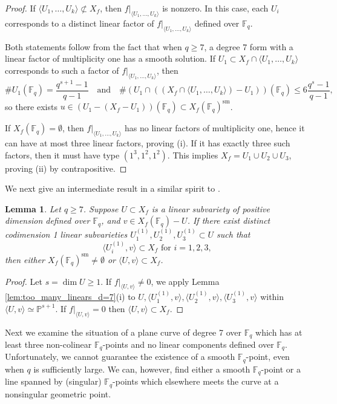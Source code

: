 \documentclass{amsart}
\newcommand{\F}{\mathbb{F}}
\renewcommand{\P}{\mathbb{P}}
\newcommand{\Span}[1]{\langle #1 \rangle}
\newcommand{\sm}{\mathrm{sm}}
\newtheorem{lemma}[theorem]{Lemma}
\theoremstyle{definition}
\numberwithin{equation}{section}
\numberwithin{table}{section}
\newcommand{\qboundgeq}[1]{{\color{cyan}$q \geq {#1}$}}
\renewcommand{\qboundgeq}[1]{{$q \geq {#1}$}}
\begin{document}
\begin{proof}
    If $\Span{U_1,\ldots,U_k} \not\subset X_f$, then $f|_{\Span{U_1,\ldots,U_k}}$ is nonzero. In this case, each $U_i$ corresponds to a distinct linear factor of $f|_{\Span{U_1,\ldots,U_k}}$ defined over $\F_q$. 
    
    Both statements follow from the fact that when \qboundgeq{7}, a degree 7 form with a linear factor of multiplicity one has a smooth solution. If $U_1 \subset X_f \cap \Span{U_1,\ldots,U_k}$ corresponds to such a factor of $f|_{\Span{U_1,\ldots,U_k}}$, then 
    \[\#U_1(\F_q) = \frac{q^{s+1} - 1}{q-1} \quad\text{and}\quad \#(U_1 \cap ((X_f \cap \Span{U_1,\ldots,U_k}) - U_1))(\F_q) \leq 6\frac{q^{s} - 1}{q-1},\]
    so there exists $u \in (U_1 - (X_f - U_1))(\F_q) \subset X_f(\F_q)^\sm$. 

    If $X_f(\F_q) = \emptyset$, then $f|_{\Span{U_1,\ldots,U_k}}$ has no linear factors of multiplicity one, hence it can have at most three linear factors, proving (i). If it has exactly three such factors, then it must have type $(1^3,1^2,1^2)$. This implies $X_f = U_1 \cup U_2 \cup U_3$, proving (ii) by contrapositive.
\end{proof}

We next give an intermediate result in a similar spirit to \cite[Lemma 5.3]{LeepYeomans1996_quintic_forms}.

\begin{lemma}
\label{lem:7.3}
    Let \qboundgeq{7}. Suppose $U \subset X_f$ is a linear subvariety of positive dimension defined over $\F_q$, and $v \in X_f(\F_q) - U$. If there exist distinct codimension 1 linear subvarieties $U_1^{(1)}, U_2^{(1)}, U_3^{(1)} \subset U$ such that
    \[\Span{U_i^{(1)}, v} \subset X_f \text{ for } i =1,2,3,\]
    then either $X_f(\F_q)^{\sm} \neq \emptyset$ or $\Span{U,v} \subset X_f$.
\end{lemma}

\begin{proof}
    Let $s = \dim U \geq 1$. If $f|_{\Span{U,v}} \neq 0$, we apply Lemma \ref{lem:too_many_linears_d=7}(i) to $U, \Span{U_1^{(1)},v}, \Span{U_2^{(1)},v}, \Span{U_3^{(1)},v}$ within $\Span{U,v} \simeq \P^{s+1}$. If $f|_{\Span{U,v}} = 0$ then $\Span{U,v} \subset X_f$.
\end{proof}

Next we examine the situation of a plane curve of degree 7 over $\F_q$ which has at least three non-colinear $\F_q$-points and no linear components defined over $\F_q$. Unfortunately, we cannot guarantee the existence of a smooth $\F_q$-point, even when $q$ is sufficiently large. We can, however, find either a smooth $\F_q$-point or a line spanned by (singular) $\F_q$-points which elsewhere meets the curve at a nonsingular geometric point.
\end{document}
